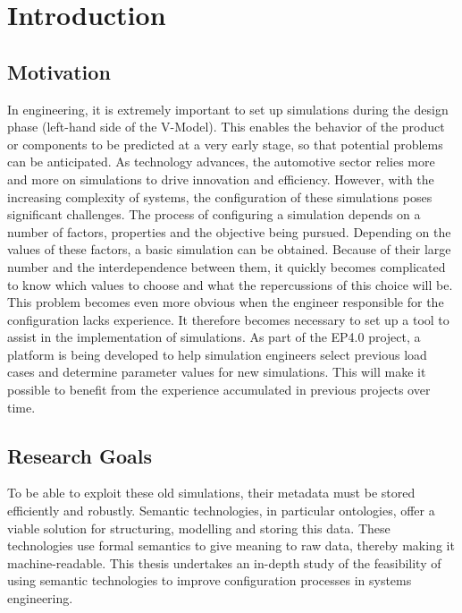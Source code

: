 \section{Introduction\label{sec:introduction}}


\subsection{Motivation}
In engineering, it is extremely important to set up simulations during the design phase (left-hand side of the V-Model). This enables the behavior of the product or components to be predicted at a very early stage, so that potential problems can be anticipated.  As technology advances, the automotive sector relies more and more on simulations to drive innovation and efficiency. However, with the increasing complexity of systems, the configuration of these simulations poses significant challenges. The process of configuring a simulation depends on a number of factors, properties and the objective being pursued. Depending on the values of these factors, a basic simulation can be obtained. Because of their large number and the interdependence between them, it quickly becomes complicated to know which values to choose and what the repercussions of this choice will be. This problem becomes even more obvious when the engineer responsible for the configuration lacks experience. It therefore becomes necessary to set up a tool to assist in the implementation of simulations. As part of the EP4.0 project, a platform is being developed to help simulation engineers select previous load cases and determine parameter values for new simulations. This will make it possible to benefit from the experience accumulated in previous projects over time.


\subsection{Research Goals}

To be able to exploit these old simulations, their metadata must be stored efficiently and robustly. Semantic technologies, in particular ontologies, offer a viable solution for structuring, modelling and storing this data. These technologies use formal semantics to give meaning to raw data, thereby making it machine-readable. This thesis undertakes an in-depth study of the feasibility of using semantic technologies to improve configuration processes in systems engineering.\\

